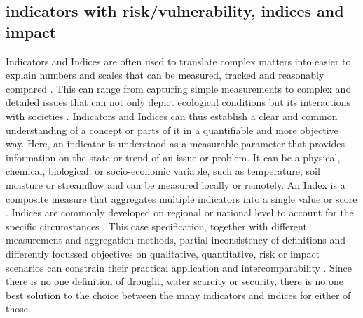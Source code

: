 
\subsection{indicators with risk/vulnerability, indices and impact} %

Indicators and Indices are often used to translate complex matters into easier to explain numbers and scales that can be measured, tracked and reasonably compared \autocite{blauveltSystematizingEnvironmentalIndicators2014,williamsUsingIndicatorsExplain2017}. This can range from capturing simple measurements to complex and detailed issues that can not only depict ecological conditions but its interactions with societies \autocite{blauveltSystematizingEnvironmentalIndicators2014,mishraWaterSecurityChanging2021}. Indicators and Indices can thus establish a clear and common understanding of a concept or parts of it in a quantifiable and more objective way.
Here, an indicator is understood as a measurable parameter that provides information on the state or trend of an issue or problem. It can be a physical, chemical, biological, or socio-economic variable, such as temperature, soil moisture or streamflow and can be measured locally or remotely. An Index is a composite measure that aggregates multiple indicators into a single value or score \autocite{unitednationsuniversityTooManyIndicators2017,williamsUsingIndicatorsExplain2017, svobodaHandbookDroughtIndicators2016}. Indices are commonly developed on regional or national level to account for the specific circumstances \autocite{unitednationsuniversityTooManyIndicators2017}. This case specification, together with different measurement and aggregation methods, partial inconsistency of definitions and differently focussed objectives on qualitative, quantitative, risk or impact scenarios can constrain their practical application and intercomparability \autocite{svobodaHandbookDroughtIndicators2016,unitednationsuniversityTooManyIndicators2017}. 
Since there is no one definition of drought, water scarcity or security, there is no one best solution to the choice between the many indicators and indices for either of those.





